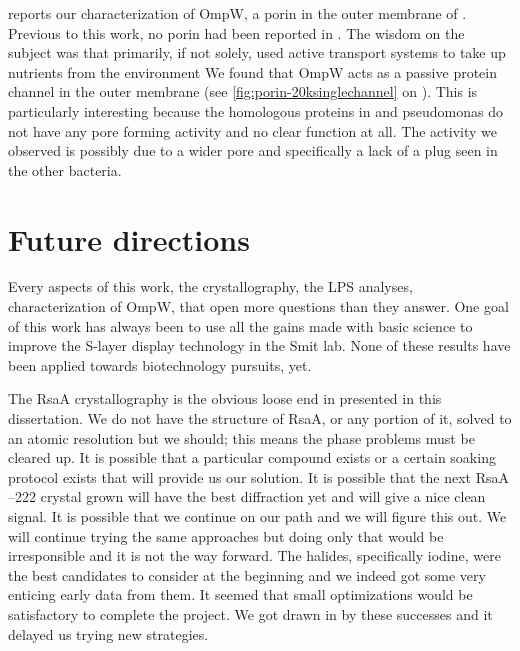  reports our characterization of OmpW, a porin in the outer membrane of \caulobacter{}. Previous to this work, no porin had been reported in \caulobacter{}. The wisdom on the subject was that \caulobacter{} primarily, if not solely, used active transport systems to take up nutrients from the environment We found that OmpW acts as a passive protein channel in the outer membrane (see \cref{fig:porin-20ksinglechannel} on ). This is particularly interesting because the homologous proteins in \ecoli{} and \ac{pseudomonas} do not have any pore forming activity and no clear function at all.  The activity we observed is possibly due to a wider pore and specifically a lack of a plug seen in the other bacteria.  

\section{Future directions}\label{sec:future-directions}

Every aspects of this work, the crystallography, the \ac{LPS} analyses, characterization of OmpW, that open more questions than they answer. One goal of this work has always been to use all the gains made with basic science to improve the \caulobacter{} \ac{S-layer} display technology in the Smit lab. None of these results have been applied towards biotechnology pursuits, yet.

The RsaA crystallography is the obvious loose end in presented in this dissertation. We do not have the structure of RsaA, or any portion of it, solved to an atomic resolution but we should; this means the phase problems must be cleared up. It is possible that a particular compound exists or a certain soaking protocol exists that will provide us our solution. It is possible that the next RsaA --222 crystal grown will have the best diffraction yet and will give a nice clean signal. It is possible that we continue on our path and we will figure this out. We will continue trying the same approaches but doing only that would be irresponsible and it is not the way forward. The halides, specifically iodine, were the best candidates to consider at the beginning and we indeed got some very enticing early data from them. It seemed that small optimizations would be satisfactory to complete the project. We got drawn in by these successes and it delayed us trying new strategies.

